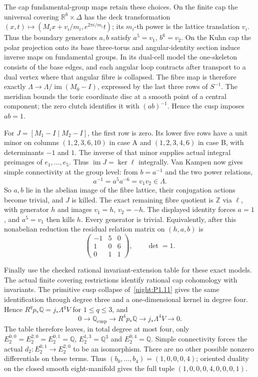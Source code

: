The cap fundamental-group maps retain these choices. On the finite
cap the universal covering $\mathbb R^6\times\Delta$ has the deck
transformation
$(x,t)\mapsto(M_ix+v_i/m_i,e^{2\pi i/m_i}t)$; its $m_i$-th power
is the lattice translation $v_i$. Thus the boundary generators
$a,b$ satisfy $a^5=v_1$, $b^6=v_2$. On the Kuhn cap the polar
projection onto its base three-torus and angular-identity section
induce inverse maps on fundamental groups. In its dual-cell model
the one-skeleton consists of the base edges, and each angular loop
contracts after transport to a dual vertex where that angular
fibre is collapsed. The fibre map is therefore exactly
$\Lambda\to\Lambda/\operatorname{im}(M_0-I)$, expressed by the last
three rows of $S^{-1}$. The meridian bounds the toric coordinate
disc at a smooth point of a central component; the zero clutch
identifies it with $(ab)^{-1}$. Hence the cusp imposes $ab=1$.

For $J=[M_1-I\mid M_2-I]$, the first row is zero. Its lower five
rows have a unit minor on columns $(1,2,3,6,10)$ in case A and
$(1,2,3,4,6)$ in case B, with determinants $-1$ and $1$.
The inverse of that minor supplies actual integral preimages of
$e_1,\ldots,e_5$. Thus
$\operatorname{im}J=\ker\ell$ integrally. Van Kampen now gives
simple connectivity at the group level: from $b=a^{-1}$ and the
two power relations,
\[
 a^{-1}=a^5a^{-6}=v_1v_2\in\Lambda.
\]
So $a,b$ lie in the abelian image of the fibre lattice, their
conjugation actions become trivial, and $J$ is killed. The exact
remaining fibre quotient is $\mathbb Z$ via $\ell$, with generator
$h$ and images $v_1=h$, $v_2=-h$. The displayed identity forces
$a=1$, and $a^5=v_1$ then kills $h$. Every generator is trivial.
Equivalently, after this nonabelian reduction the residual relation
matrix on $(h,a,b)$ is
\[
 \begin{pmatrix}-1&5&0\\1&0&6\\0&1&1\end{pmatrix},
 \qquad\det=1.
\]

Finally use the checked rational invariant-extension table for these
exact models. The actual finite covering restrictions identify
rational cap cohomology with invariants. The primitive cusp collapse
of~\ref{night:P1.11} gives the same identification through degree
three and a one-dimensional kernel in degree four. Hence
$R^q p_*\mathbb Q=j_*\Lambda^qV$ for $1\le q\le3$, and
\[
 0\longrightarrow\mathbb Q_{\mathrm{cusp}}
 \longrightarrow R^4p_*\mathbb Q
 \longrightarrow j_*\Lambda^4V\longrightarrow0.
\]
The table therefore leaves, in total degree at most four, only
$E_2^{0,0}=E_2^{2,0}=E_2^{0,1}=\mathbb Q$,
$E_2^{1,3}=\mathbb Q^3$ and $E_2^{0,4}=\mathbb Q$.
Simple connectivity forces the actual
$d_2:E_2^{0,1}\to E_2^{2,0}$ to be an isomorphism. There are no
other possible nonzero differentials on these terms. Thus
$(b_0,\ldots,b_4)=(1,0,0,0,4)$; oriented duality on the closed
smooth eight-manifold gives the full tuple
$(1,0,0,0,4,0,0,0,1)$.
